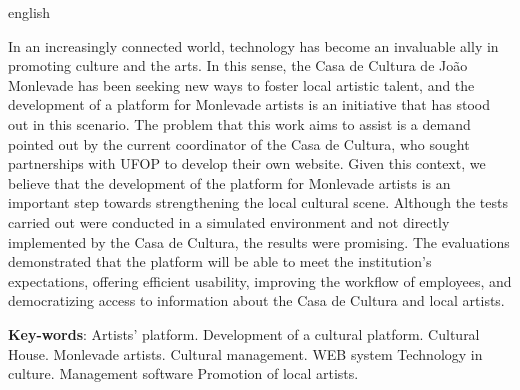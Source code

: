 \begin{resumo}[Abstract]
 \begin{otherlanguage*}{english}

  In an increasingly connected world, technology has become an invaluable ally in promoting culture and the arts. In this sense, the Casa de Cultura de João Monlevade has been seeking new ways to foster local artistic talent, and the development of a platform for Monlevade artists is an initiative that has stood out in this scenario. The problem that this work aims to assist is a demand pointed out by the current coordinator of the Casa de Cultura, who sought partnerships with UFOP to develop their own website. Given this context, we believe that the development of the platform for Monlevade artists is an important step towards strengthening the local cultural scene. Although the tests carried out were conducted in a simulated environment and not directly implemented by the Casa de Cultura, the results were promising. The evaluations demonstrated that the platform will be able to meet the institution's expectations, offering efficient usability, improving the workflow of employees, and democratizing access to information about the Casa de Cultura and local artists.

   \vspace{\onelineskip}

   \noindent
   \textbf{Key-words}: 
   Artists' platform.
   Development of a cultural platform.
   Cultural House.
   Monlevade artists.
   Cultural management.
   WEB system
   Technology in culture.
   Management software
   Promotion of local artists.
 \end{otherlanguage*}
\end{resumo}